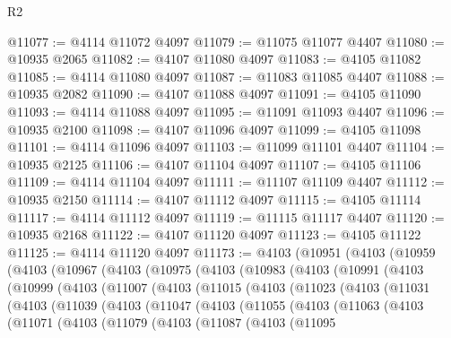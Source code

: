 \begin{lexlean}{R2}
\begin{coremodule}
@11077 := @4114 @11072 @4097
@11079 := @11075 @11077 @4407
@11080 := @10935 @2065
@11082 := @4107 @11080 @4097
@11083 := @4105 @11082
@11085 := @4114 @11080 @4097
@11087 := @11083 @11085 @4407
@11088 := @10935 @2082
@11090 := @4107 @11088 @4097
@11091 := @4105 @11090
@11093 := @4114 @11088 @4097
@11095 := @11091 @11093 @4407
@11096 := @10935 @2100
@11098 := @4107 @11096 @4097
@11099 := @4105 @11098
@11101 := @4114 @11096 @4097
@11103 := @11099 @11101 @4407
@11104 := @10935 @2125
@11106 := @4107 @11104 @4097
@11107 := @4105 @11106
@11109 := @4114 @11104 @4097
@11111 := @11107 @11109 @4407
@11112 := @10935 @2150
@11114 := @4107 @11112 @4097
@11115 := @4105 @11114
@11117 := @4114 @11112 @4097
@11119 := @11115 @11117 @4407
@11120 := @10935 @2168
@11122 := @4107 @11120 @4097
@11123 := @4105 @11122
@11125 := @4114 @11120 @4097
@11173 := @4103
    (@10951
      (@4103
        (@10959
          (@4103
            (@10967
              (@4103
                (@10975
                  (@4103
                    (@10983
                      (@4103
                        (@10991
                          (@4103
                            (@10999
                              (@4103
                                (@11007
                                  (@4103
                                    (@11015
                                      (@4103
                                        (@11023
                                          (@4103
                                            (@11031
                                              (@4103
                                                (@11039
                                                  (@4103
                                                    (@11047
                                                      (@4103
                                                        (@11055
                                                          (@4103
                                                            (@11063
                                                              (@4103
                                                                (@11071
                                                                  (@4103
                                                                    (@11079
                                                                      (@4103
                                                                        (@11087
                                                                          (@4103
                                                                            (@11095

\end{coremodule}
\end{lexlean}
